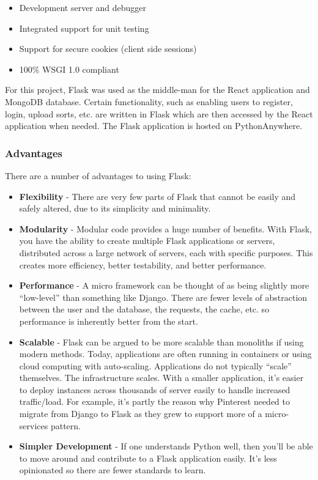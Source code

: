 \begin{itemize}
    \item Development server and debugger
    \item Integrated support for unit testing
    \item Support for secure cookies (client side sessions)
    \item 100\% WSGI 1.0 compliant
\end{itemize}

For this project, Flask was used as the middle-man for the React application and
MongoDB database. Certain functionality, such as enabling users to register, 
login, upload sorts, etc. are written in Flask which are then accessed by the 
React application when needed. The Flask application is hosted on 
PythonAnywhere.

\subsubsection{Advantages}
There are a number of advantages to using Flask:

\begin{itemize}
    \item \textbf{Flexibility} - There are very few parts of Flask that cannot
    be easily and safely altered, due to its simplicity and minimality.
    \item \textbf{Modularity} - Modular code provides a huge number of benefits.
    With Flask, you have the ability to create multiple Flask applications or 
    servers, distributed across a large network of servers, each with specific 
    purposes. This creates more efficiency, better testability, and better 
    performance.
    \item \textbf{Performance} - A micro framework can be thought of as being 
    slightly more “low-level” than something like Django. There are fewer levels
    of abstraction between the user and the database, the requests, the cache, 
    etc. so performance is inherently better from the start.
    \item \textbf{Scalable} - Flask can be argued to be more scalable than 
    monoliths if using modern methods. Today, applications are often running in 
    containers or using cloud computing with auto-scaling. Applications do not 
    typically “scale” themselves. The infrastructure scales. With a smaller 
    application, it's easier to deploy instances across thousands of server 
    easily to handle increased traffic/load. For example, it's partly the reason
    why Pinterest needed to migrate from Django to Flask as they grew to support
    more of a micro-services pattern.
    \item \textbf{Simpler Development} - If one understands Python well, then 
    you’ll be able to move around and contribute to a Flask application easily. 
    It’s less opinionated so there are fewer standards to learn.
\end{itemize}

